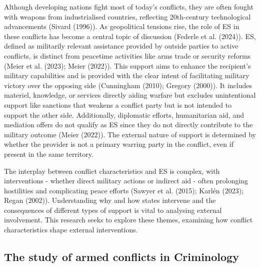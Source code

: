 \documentclass[
]{article}
\begin{document}
Although developing nations fight most of today's conflicts, they are
often fought with weapons from industrialised countries, reflecting
20th-century technological advancements (Sivard (1996)). As geopolitical
tensions rise, the role of ES in these conflicts has become a central
topic of discussion (Federle et al. (2024)). ES, defined as militarily
relevant assistance provided by outside parties to active conflicts, is
distinct from peacetime activities like arms trade or security reforms
(Meier et al. (2023); Meier (2022)). This support aims to enhance the
recipient's military capabilities and is provided with the clear intent
of facilitating military victory over the opposing side (Cunningham
(2010); Gregory (2000)). It includes materiel, knowledge, or services
directly aiding warfare but excludes unintentional support like
sanctions that weakens a conflict party but is not intended to support
the other side. Additionally, diplomatic efforts, humanitarian aid, and
mediation offers do not qualify as ES since they do not directly
contribute to the military outcome (Meier (2022)). The external nature
of support is determined by whether the provider is not a primary
warring party in the conflict, even if present in the same territory.

The interplay between conflict characteristics and ES is complex, with
interventions - whether direct military actions or indirect aid - often
prolonging hostilities and complicating peace efforts (Sawyer et al.
(2015); Karlén (2023); Regan (2002)). Understanding why and how states
intervene and the consequences of different types of support is vital to
analysing external involvement. This research seeks to explore these
themes, examining how conflict characteristics shape external
interventions.

\subsection{The study of armed conflicts in
Criminology}\label{the-study-of-armed-conflicts-in-criminology}
\end{document}
